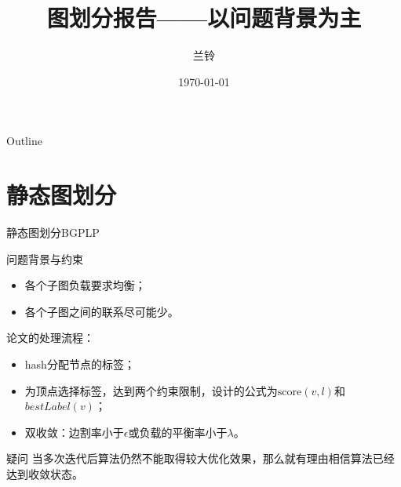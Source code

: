 \documentclass[no-math]{ctexbeamer}
\title[Problem Background]{图划分报告——以问题背景为主}
\author{兰铃}
\institute{1307}
\date{\today}
\begin{document}
\begin{frame}
  \titlepage
\end{frame}

\begin{frame}{Outline}
  \tableofcontents
\end{frame}

\section{静态图划分}

\begin{frame}{静态图划分BGPLP}
    \begin{block}{问题背景与约束}
        \begin{itemize}
            \item 各个子图负载要求均衡；
            \item 各个子图之间的联系尽可能少。
        \end{itemize}
    \end{block}
    论文的处理流程：\citet{target_distribution_1}
    \begin{itemize}
        \item hash分配节点的标签；
        \item 为顶点选择标签，达到两个约束限制，设计的公式为$\text{score}(v,l)$和$bestLabel(v)$；
        \item 双收敛：边割率小于$\epsilon$或负载的平衡率小于$\lambda$。
    \end{itemize}

    \begin{alertblock}{疑问}
        当多次迭代后算法仍然不能取得较大优化效果，那么就有理由相信算法已经达到收敛状态。
    \end{alertblock}
\end{frame}


\end{document}
